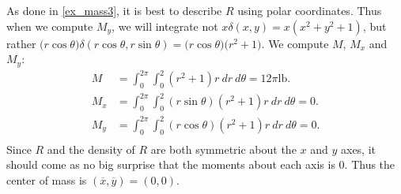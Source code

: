 {As done in \autoref{ex_mass3}, it is best to describe $R$ using polar coordinates.
Thus when we compute $M_y$, we will integrate not $x\delta(x,y) = x(x^2+y^2+1)$, but rather $\big(r\cos\theta\big)\delta(r\cos\theta,r\sin\theta) = \big(r\cos\theta\big)\big(r^2+1\big).$ We compute $M$, $M_x$ and $M_y$:
\begin{align*}
M &= \int_0^{2\pi}\int_0^2 (r^2+1)r\ dr\ d\theta = 12\pi%
\text{lb}.\\
M_x &= \int_0^{2\pi}\int_0^2 (r\sin\theta)(r^2+1)r \ dr\ d\theta = 0.\\
M_y &= \int_0^{2\pi}\int_0^2 (r\cos\theta)(r^2+1)r \ dr\ d\theta = 0.\\
\end{align*}
Since $R$ and the density of $R$ are both symmetric about the $x$ and $y$ axes, it should come as no big surprise that the moments about each axis is 0. Thus the center of mass is $(\overline{x},\overline{y})=(0,0)$. }


